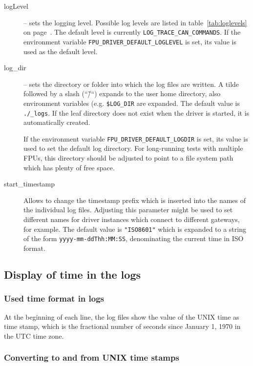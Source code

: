 \documentclass[11pt,a4paper]{scrartcl}
\begin{document}
\begin{description}
\item[logLevel] -- sets the logging level. Possible log levels are
  listed in table~\ref{tab:loglevels} on
  page~\pageref{tab:loglevels}. The default level is currently
  \texttt{LOG\_TRACE\_CAN\_COMMANDS}. If the environment variable
  \texttt{FPU\_DRIVER\_DEFAULT\_LOGLEVEL} is set, its value is used as
  the default level.
  
  \item [log\_dir] -- sets the directory or folder into which the log
    files are written. A tilde followed by a slash (``\~/``) expands
    to the user home directory, also environment variables
    (e.g. \texttt{\$LOG\_DIR} are expanded. The default value is
    \texttt{./\_logs}. If the leaf directory does not exist when the
    driver is started, it is automatically created.

    If the environment variable \texttt{FPU\_DRIVER\_DEFAULT\_LOGDIR}
    is set, its value is used to set the default log directory.  For
    long-running tests with multiple FPUs, this directory should be
    adjusted to point to a file system path which has plenty of free
    space.

  \item[start\_timestamp] Allows to change the timestamp prefix which
    is inserted into the names of the individual log files.  Adjusting
    this parameter might be used to set different names for driver
    instances which connect to different gateways, for example.  The
    default value is \verb+"ISO8601"+ which is expanded to a string of
    the form \verb+yyyy-mm-ddThh:MM:SS+, denominating the current time
    in ISO format.
    
\end{description}

\subsection{Display of time in the logs}
\subsubsection{Used time format in logs}
At the beginning of each line, the log files show the value of the
UNIX time as time stamp, which is the fractional number of seconds
since January 1, 1970 in the UTC time zone. 

\subsubsection{Converting to and from UNIX time stamps}
\end{document}
